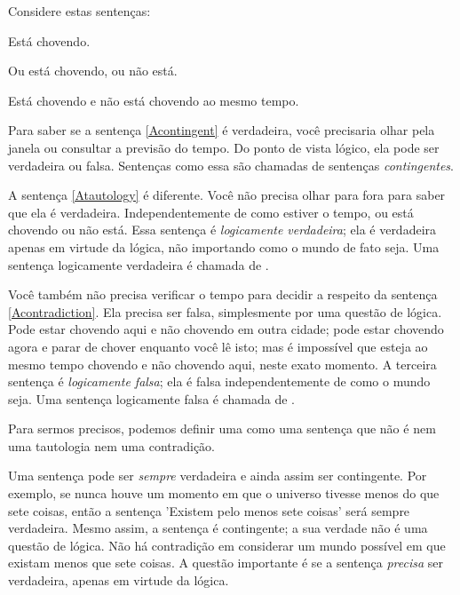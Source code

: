 Considere estas sentenças:
\begin{earg}
\item[\ex{Acontingent}] Está chovendo.
\item[\ex{Atautology}] Ou está chovendo, ou não está.
\item[\ex{Acontradiction}] Está chovendo e não está chovendo ao mesmo tempo.
\end{earg}
Para saber se a sentença \ref{Acontingent} é verdadeira, você precisaria olhar pela janela ou consultar a previsão do tempo. Do ponto de vista lógico, ela pode ser verdadeira ou falsa. Sentenças como essa são chamadas de sentenças \emph{contingentes}.

A sentença \ref{Atautology} é diferente. Você não precisa olhar para fora para saber que ela é verdadeira. Independentemente de como estiver o tempo, ou está chovendo ou não está. Essa sentença é \emph{logicamente verdadeira}; ela é verdadeira apenas em virtude da lógica, não importando como o mundo de fato seja. Uma sentença logicamente verdadeira é chamada de .

Você também não precisa verificar o tempo para decidir a respeito da sentença \ref{Acontradiction}. Ela precisa ser falsa, simplesmente por uma questão de lógica. Pode estar chovendo aqui e não chovendo em outra cidade; pode estar chovendo agora e parar de chover enquanto você lê isto; mas é impossível que esteja ao mesmo tempo chovendo e não chovendo aqui, neste exato momento. A terceira sentença é \emph{logicamente falsa}; ela é falsa independentemente de como o mundo seja. Uma sentença logicamente falsa é chamada de .

Para sermos precisos, podemos definir uma  como uma sentença que não é nem uma tautologia nem uma contradição.

Uma sentença pode ser \emph{sempre} verdadeira e ainda assim ser contingente. Por exemplo, se nunca houve um momento em que o universo tivesse menos do que sete coisas, então a sentença 'Existem pelo menos sete coisas' será sempre verdadeira. Mesmo assim, a sentença é contingente; a sua verdade não é uma questão de lógica. Não há contradição em considerar um mundo possível em que existam menos que sete coisas. A questão importante é se a sentença \emph{precisa} ser verdadeira, apenas em virtude da lógica.

